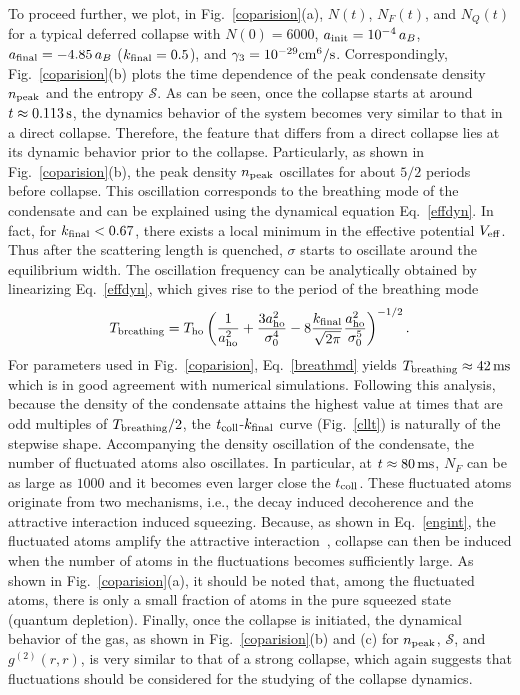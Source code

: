 \documentclass[pra,twocolumn,preprintnumbers,superscriptaddress,longbibliography,showkeys]{revtex4-1}
\begin{document}
To proceed further, we plot, in Fig.~\ref{coparision}(a), $N(t)$, $N_F(t)$, and $N_{Q}(t)$ for a typical deferred collapse with $N(0) = 6000$, $a_{\rm init} = 10^{-4}\,a_B$, $a_{\rm final}=-4.85\,a_B$ ($k_{\rm final} = 0.5$), and $\gamma_{3} = 10^{-29} {\rm cm}^{6} / {\rm s}$. Correspondingly, Fig.~\ref{coparision}(b) plots the time dependence of the peak condensate density $n_{\rm peak}$ and the entropy $\mathcal{S}$. As can be seen, once the collapse starts at around $t\approx0.113\,{\rm s}$, the dynamics behavior of the system becomes very similar to that in a direct collapse. Therefore, the feature that differs from a direct collapse lies at its dynamic behavior prior to the collapse. Particularly, as shown in Fig.~\ref{coparision}(b), the peak density $n_{\rm peak}$ oscillates for about $5/2$ periods before collapse. This oscillation corresponds to the breathing mode of the condensate and can be explained using the dynamical equation Eq.~\eqref{effdyn}. In fact, for $k_{\rm final}<0.67$, there exists a local minimum in the effective potential $V_{\rm eff}$. Thus after the scattering length is quenched, $\sigma$ starts to oscillate around the equilibrium width. The oscillation frequency can be analytically obtained by linearizing Eq.~\eqref{effdyn}, which gives rise to the period of the breathing mode
\begin{align}
T_{\rm breathing}=T_{\rm ho} \left(\frac{1}{a^{2}_{\rm ho}} + \frac{3 a^{2}_{\rm ho}}{\sigma_0^{4}} - 8 \frac{k_{\rm final}}{\sqrt{2 \pi}} \frac{a^{2}_{\rm ho}}{\sigma_0^{5}}\right)^{-1/2}.\label{breathmd}
\end{align}
For parameters used in Fig.~\ref{coparision}, Eq.~\eqref{breathmd} yields $T_{\rm breathing}\approx42\,{\rm ms}$ which is in good agreement with numerical simulations. Following this analysis, because the density of the condensate attains the highest value at times that are odd multiples of $T_{\rm breathing}/2$, the $t_{\rm coll}$-$k_{\rm final}$ curve (Fig.~\ref{cllt}) is naturally of the stepwise shape. Accompanying the density oscillation of the condensate, the number of fluctuated atoms also oscillates. In particular, at $t\approx 80\,{\rm ms}$, $N_F$ can be as large as $1000$ and it becomes even larger close the $t_{\rm coll}$. These fluctuated atoms originate from two mechanisms, i.e., the decay induced decoherence and the attractive interaction induced squeezing. Because, as shown in Eq.~\eqref{engint}, the fluctuated atoms amplify the attractive interaction~\cite{Shi2019}, collapse can then be induced when the number of atoms in the fluctuations becomes sufficiently large. As shown in Fig.~\ref{coparision}(a), it should be noted that, among the fluctuated atoms, there is only a small fraction of atoms in the pure squeezed state (quantum depletion). Finally, once the collapse is initiated, the dynamical behavior of the gas, as shown in Fig.~\ref{coparision}(b) and (c) for $n_{\rm peak}$, $\mathcal{S}$, and $g^{(2)}(r,r)$, is very similar to that of a strong collapse, which again suggests that fluctuations should be considered for the studying of the collapse dynamics.
\end{document}
